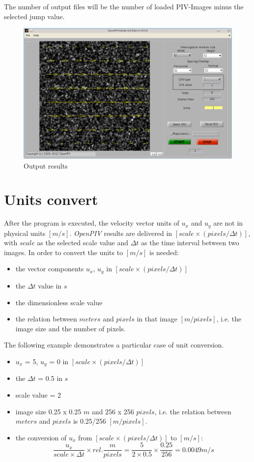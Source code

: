 The number of output files will be the number of loaded PIV-Images minus the selected jump value.

\begin{figure}[H]
	\centering
	\includegraphics[width=\textwidth]{Images/Output.png}
	\caption{Output results}
	\label{fig:Out}
\end{figure}

\section{Units convert}\label{Units}
After the program is executed, the velocity vector units of $u_{x}$ and $u_{y}$ are not in 
physical units $[m/s]$. \emph{OpenPIV} results are delivered in $[scale\times(pixels/\Delta t)]$, 
with $scale$ as the selected scale value and $\Delta t$ as the time interval between two images. 
In order to convert the units to $[m/s]$ is needed:

\begin{itemize}
      	\item the vector components $u_{x}$, $u_{y}$ in $[scale\times(pixels/\Delta t)]$
      	\item the $\Delta t$ value in $s$
      	\item the dimensionless scale value
	\item the relation between $meters$ and $pixels$ in that image $[m/pixels]$, i.e. the 
	      image size and the number of pixels.
\end{itemize}

The following example demonstrates a particular case of unit conversion.

\begin{itemize}
      	\item $u_{x}$ = 5, $u_{y}$ = 0 in $[scale\times(pixels/\Delta t)]$
      	\item the $\Delta t$ = 0.5 in $s$
      	\item scale value = 2
        \item image size 0.25 x 0.25 $m$ and 256 x 256 $pixels$, i.e. the relation between 
	      $meters$ and $pixels$ is 0.25/256 $[m/pixels]$.
    	\item the conversion of $u_{x}$ from $[scale\times(pixels/\Delta t)]$ to $[m/s]$:
        \[
         \frac{u_{x}}{scale\times\Delta t}\times rel.\frac{m}{pixels}=\frac{5}{2\times0.5}\times 
         \frac{0.25}{256}=0.0049 m/s
        \]
\end{itemize}
